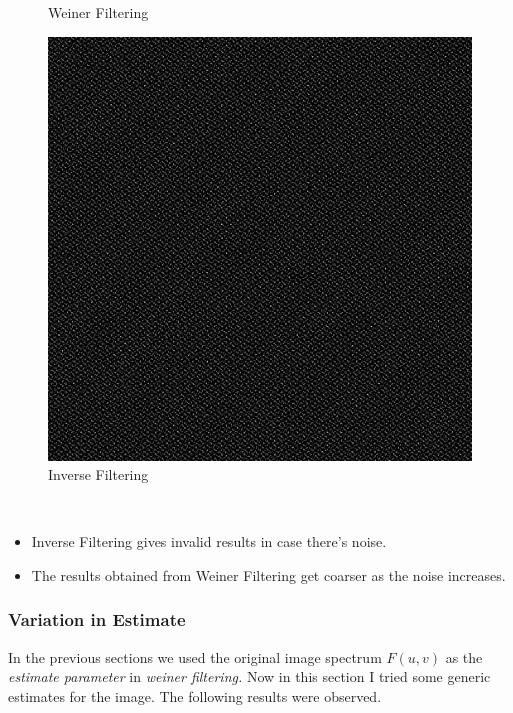 \documentclass{article}
\begin{document}
\begin{figure}[!htb]
      \caption{Weiner Filtering}
    \endminipage\hfill
      \includegraphics[scale=.28]{./deblurring/0_1/inverse.png}
      \caption{Inverse Filtering}
    \endminipage
    \end{figure}\\[5pt]
    \begin{itemize}
        \item Inverse Filtering gives invalid results in case there's noise.
        \item The results obtained from Weiner Filtering get coarser as the noise increases.
    \end{itemize}
    \pagebreak


    
    \subsubsection*{Variation in Estimate}
    In the previous sections we used the original image spectrum \(F(u,v)\) as the \textit{estimate parameter} in \textit{weiner filtering.} Now in this section I tried some generic estimates for the image. The following results were observed.
    
\end{document}
